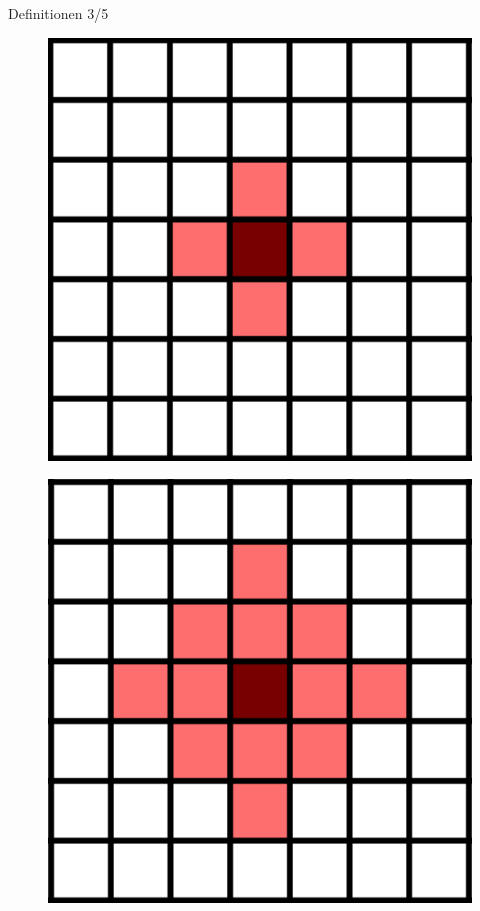 \documentclass[aspectratio=169]{beamer}
\begin{document}
\begin{frame}{Definitionen 3/5}
\begin{multicols*}{2}
      \begin{multicols*}{2}
      \begin{figure}[H]
        \centering
        \includegraphics[width = 0.28 \textheight]{von_Neumann_1.png}
      \end{figure}

      \begin{figure}[H]
        \centering
        \includegraphics[width = 0.28 \textheight]{von_Neumann_2.png}
      \end{figure}


\end{multicols*}
\end{multicols*}
\end{frame}
\end{document}
